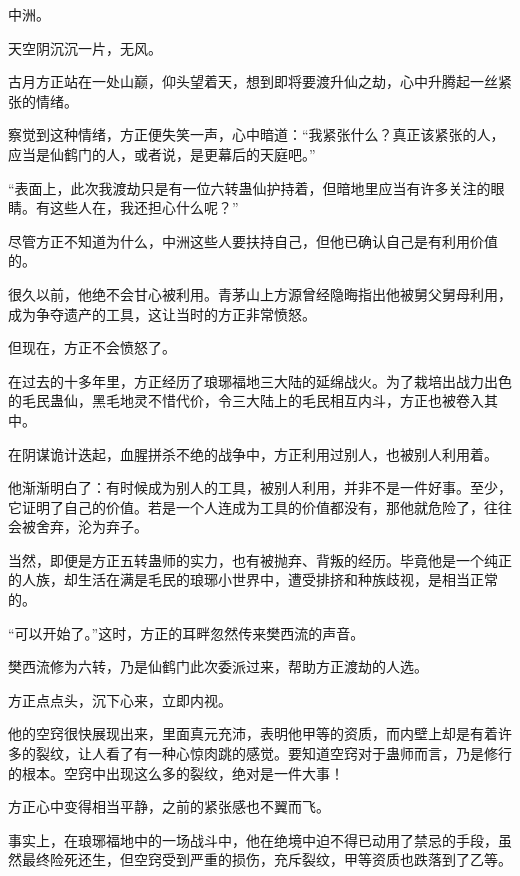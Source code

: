 
\begin{this_body}

中洲。

天空阴沉沉一片，无风。

古月方正站在一处山巅，仰头望着天，想到即将要渡升仙之劫，心中升腾起一丝紧张的情绪。

察觉到这种情绪，方正便失笑一声，心中暗道：“我紧张什么？真正该紧张的人，应当是仙鹤门的人，或者说，是更幕后的天庭吧。”

“表面上，此次我渡劫只是有一位六转蛊仙护持着，但暗地里应当有许多关注的眼睛。有这些人在，我还担心什么呢？”

尽管方正不知道为什么，中洲这些人要扶持自己，但他已确认自己是有利用价值的。

很久以前，他绝不会甘心被利用。青茅山上方源曾经隐晦指出他被舅父舅母利用，成为争夺遗产的工具，这让当时的方正非常愤怒。

但现在，方正不会愤怒了。

在过去的十多年里，方正经历了琅琊福地三大陆的延绵战火。为了栽培出战力出色的毛民蛊仙，黑毛地灵不惜代价，令三大陆上的毛民相互内斗，方正也被卷入其中。

在阴谋诡计迭起，血腥拼杀不绝的战争中，方正利用过别人，也被别人利用着。

他渐渐明白了：有时候成为别人的工具，被别人利用，并非不是一件好事。至少，它证明了自己的价值。若是一个人连成为工具的价值都没有，那他就危险了，往往会被舍弃，沦为弃子。

当然，即便是方正五转蛊师的实力，也有被抛弃、背叛的经历。毕竟他是一个纯正的人族，却生活在满是毛民的琅琊小世界中，遭受排挤和种族歧视，是相当正常的。

“可以开始了。”这时，方正的耳畔忽然传来樊西流的声音。

樊西流修为六转，乃是仙鹤门此次委派过来，帮助方正渡劫的人选。

方正点点头，沉下心来，立即内视。

他的空窍很快展现出来，里面真元充沛，表明他甲等的资质，而内壁上却是有着许多的裂纹，让人看了有一种心惊肉跳的感觉。要知道空窍对于蛊师而言，乃是修行的根本。空窍中出现这么多的裂纹，绝对是一件大事！

方正心中变得相当平静，之前的紧张感也不翼而飞。

事实上，在琅琊福地中的一场战斗中，他在绝境中迫不得已动用了禁忌的手段，虽然最终险死还生，但空窍受到严重的损伤，充斥裂纹，甲等资质也跌落到了乙等。


\end{this_body}
